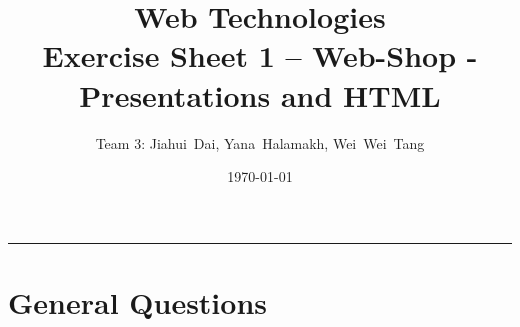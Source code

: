 \documentclass[a4paper,12pt]{article} %
\title{Web Technologies \\
        \large{Exercise Sheet 1 -- Web-Shop - Presentations and HTML}} %
\author{Team 3: Jiahui~Dai, Yana~Halamakh, Wei~Wei~Tang} %
\date{\today} %
\begin{document}
\maketitle %
\hrule %
\tableofcontents %
\newpage



\section{General Questions}




















\end{document}
